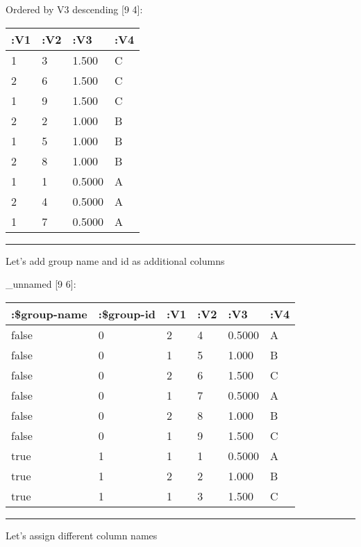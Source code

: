 \documentclass[]{article}
\newenvironment{Shaded}{\begin{snugshade}}{\end{snugshade}}
\newcommand{\KeywordTok}[1]{\textcolor[rgb]{0.13,0.29,0.53}{\textbf{#1}}}
\newcommand{\DecValTok}[1]{\textcolor[rgb]{0.00,0.00,0.81}{#1}}
\newcommand{\StringTok}[1]{\textcolor[rgb]{0.31,0.60,0.02}{#1}}
\newcommand{\VariableTok}[1]{\textcolor[rgb]{0.00,0.00,0.00}{#1}}
\newcommand{\AttributeTok}[1]{\textcolor[rgb]{0.77,0.63,0.00}{#1}}
\newcommand{\NormalTok}[1]{#1}
\begin{document}
Ordered by V3 descending {[}9 4{]}:

\begin{longtable}[]{@{}llll@{}}
\toprule
:V1 & :V2 & :V3 & :V4\tabularnewline
\midrule
\endhead
1 & 3 & 1.500 & C\tabularnewline
2 & 6 & 1.500 & C\tabularnewline
1 & 9 & 1.500 & C\tabularnewline
2 & 2 & 1.000 & B\tabularnewline
1 & 5 & 1.000 & B\tabularnewline
2 & 8 & 1.000 & B\tabularnewline
1 & 1 & 0.5000 & A\tabularnewline
2 & 4 & 0.5000 & A\tabularnewline
1 & 7 & 0.5000 & A\tabularnewline
\bottomrule
\end{longtable}

\begin{center}\rule{0.5\linewidth}{0.5pt}\end{center}

Let's add group name and id as additional columns

\begin{Shaded}
\end{Shaded}

\_unnamed {[}9 6{]}:

\begin{longtable}[]{@{}llllll@{}}
\toprule
:\$group-name & :\$group-id & :V1 & :V2 & :V3 & :V4\tabularnewline
\midrule
\endhead
false & 0 & 2 & 4 & 0.5000 & A\tabularnewline
false & 0 & 1 & 5 & 1.000 & B\tabularnewline
false & 0 & 2 & 6 & 1.500 & C\tabularnewline
false & 0 & 1 & 7 & 0.5000 & A\tabularnewline
false & 0 & 2 & 8 & 1.000 & B\tabularnewline
false & 0 & 1 & 9 & 1.500 & C\tabularnewline
true & 1 & 1 & 1 & 0.5000 & A\tabularnewline
true & 1 & 2 & 2 & 1.000 & B\tabularnewline
true & 1 & 1 & 3 & 1.500 & C\tabularnewline
\bottomrule
\end{longtable}

\begin{center}\rule{0.5\linewidth}{0.5pt}\end{center}

Let's assign different column names

\begin{Shaded}
\end{Shaded}
\end{document}
